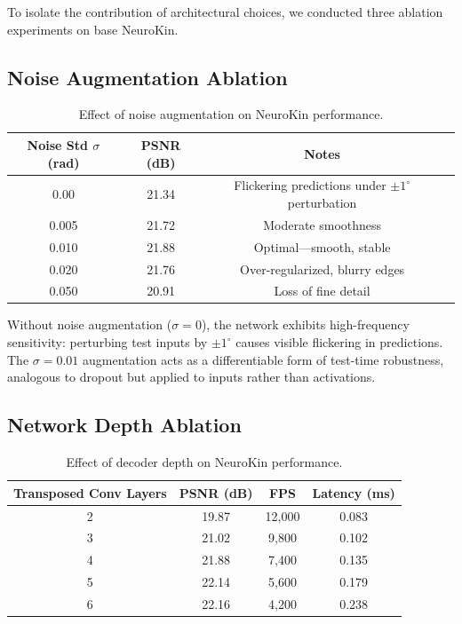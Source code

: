 ﻿\documentclass[12pt,a4paper,oneside]{report}
\begin{document}
To isolate the contribution of architectural choices, we conducted three ablation experiments on base NeuroKin.

\subsection{Noise Augmentation Ablation}

\begin{table}[H]
\centering
\caption{Effect of noise augmentation on NeuroKin performance.}
\label{tab:noise_ablation}
\begin{tabular}{cccc}
\toprule
Noise Std $\sigma$ (rad) & PSNR (dB) & Notes \\
\midrule
0.00 & 21.34 & Flickering predictions under $\pm1^\circ$ perturbation \\
0.005 & 21.72 & Moderate smoothness \\
0.010 & 21.88 & Optimal---smooth, stable \\
0.020 & 21.76 & Over-regularized, blurry edges \\
0.050 & 20.91 & Loss of fine detail \\
\bottomrule
\end{tabular}
\end{table}

Without noise augmentation ($\sigma = 0$), the network exhibits high-frequency sensitivity: perturbing test inputs by $\pm1^\circ$ causes visible flickering in predictions. The $\sigma = 0.01$ augmentation acts as a differentiable form of test-time robustness, analogous to dropout but applied to inputs rather than activations.

\subsection{Network Depth Ablation}

\begin{table}[H]
\centering
\caption{Effect of decoder depth on NeuroKin performance.}
\label{tab:depth_ablation}
\begin{tabular}{cccc}
\toprule
Transposed Conv Layers & PSNR (dB) & FPS & Latency (ms) \\
\midrule
2 & 19.87 & 12,000 & 0.083 \\
3 & 21.02 & 9,800 & 0.102 \\
4 & 21.88 & 7,400 & 0.135 \\
5 & 22.14 & 5,600 & 0.179 \\
6 & 22.16 & 4,200 & 0.238 \\
\bottomrule
\end{tabular}
\end{table}
\end{document}
